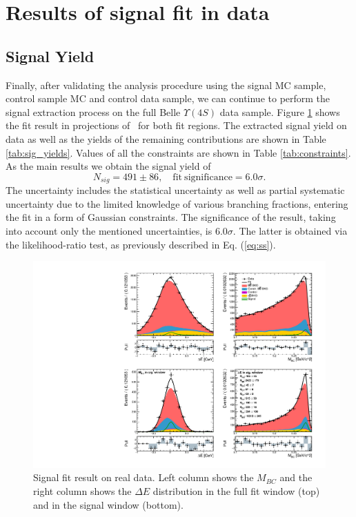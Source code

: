 \section{Results of signal fit in data}\label{sec:final-results-from-data}

\subsection{Signal Yield}

Finally, after validating the analysis procedure using the signal MC sample, control sample MC and control data sample, we can continue to perform the signal extraction process on the full Belle $\Upsilon(4S)$ data sample. Figure \ref{fig:sig_fit_data} shows the fit result in projections of \vars~for both fit regions. The extracted signal yield on data as well as the yields of the remaining contributions are shown in Table \ref{tab:sig_yields}. Values of all the constraints are shown in Table \ref{tab:constraints}. As the main results we obtain the signal yield of 
\begin{equation}
\label{eq:main_result}
N {}_{sig} = 491 \pm 86,\quad\mathrm{fit~significance} = 6.0\sigma.
\end{equation}
The uncertainty includes the statistical uncertainty as well as partial systematic uncertainty due to the limited knowledge of various branching fractions, entering the fit in a form of Gaussian constraints. The significance of the result, taking into account only the mentioned uncertainties, is $6.0\sigma$. The latter is obtained via the likelihood-ratio test, as previously described in Eq. (\ref{eq:ss}).

\begin{figure}[H]
	\centering
	\captionsetup{width=0.8\linewidth}
	\includegraphics[width=\linewidth]{fig/sig_fit_data}
	\caption{Signal fit result on real data. Left column shows the $M_{BC}$ and the right column shows the $\Delta E$ distribution in the full fit window (top) and in the signal window (bottom).}
	\label{fig:sig_fit_data}
\end{figure} 

